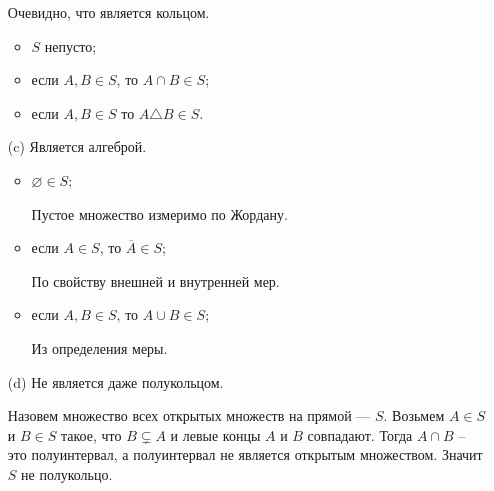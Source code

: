 \begin{solution}
\begin{enumerate}
    Очевидно, что является кольцом.
    \begin{itemize}
        \item $S$ непусто;

        \item если $A, B \in S$, то $A \cap B \in S$;
        
        \item если $A, B \in S$ то $A \triangle B \in S$.
    \end{itemize}
    
    \item[(c)] Является алгеброй.
    \begin{itemize}
        \item $\varnothing \in S$;

        Пустое множество измеримо по Жордану.
        \item если $A \in S$, то $\overline{A} \in S$;
        
        По свойству внешней и внутренней мер.
        \item если $A, B \in S$, то $A \cup B \in S$;
        
        Из определения меры.
    \end{itemize}
    
    \item[(d)] Не является даже полукольцом. 
    
    Назовем множество всех открытых множеств на прямой --- $S$.
    Возьмем $A \in S$ и $B \in S$ такое, что $B \subsetneq A$ и левые концы $A$ и $B$ совпадают. Тогда $A \cap B$ -- это полуинтервал, а полуинтервал не является открытым множеством. Значит $S$ не полукольцо.
\end{enumerate}
\end{solution}
